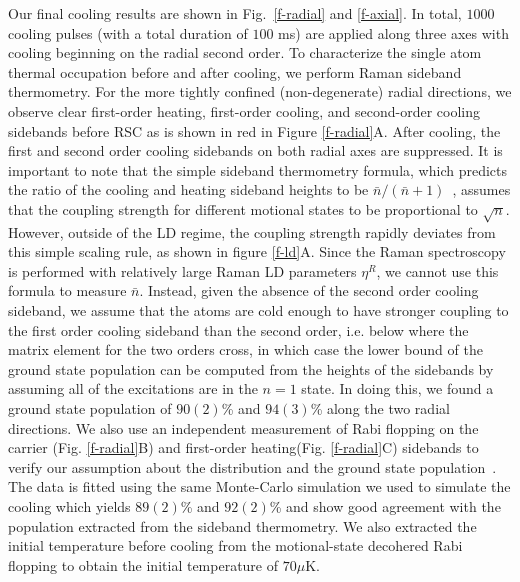 \documentclass[aps,prl,twocolumn,groupedaddress]{revtex4-1}
\begin{document}
Our final cooling results are shown in Fig.~\ref{f-radial} and \ref{f-axial}.
In total, $1000$ cooling pulses (with a total duration of $100$ ms) are applied
along three axes with cooling beginning on the radial second order.
To characterize the single atom thermal occupation before and after cooling,
we perform Raman sideband thermometry.
For the more tightly confined (non-degenerate) radial directions,
we observe clear first-order heating, first-order cooling,
and second-order cooling sidebands before RSC as is shown in red in Figure \ref{f-radial}A.
After cooling, the first and second order cooling sidebands on both radial axes are suppressed.
It is important to note that the simple sideband thermometry formula,
which predicts the ratio of the cooling and heating sideband heights
to be $\bar n / (\bar n + 1)$~\cite{Monroe1995},
assumes that the coupling strength for different motional states to be proportional to $\sqrt{n}$.
However, outside of the LD regime,
the coupling strength rapidly deviates from this simple scaling rule,
as shown in figure \ref{f-ld}A. Since the Raman spectroscopy is performed
with relatively large Raman LD parameters $\eta^R$, we cannot use this formula to
measure $\bar n$.
Instead, given the absence of the second order cooling sideband,
we assume that the atoms are cold enough to have stronger coupling to the first order cooling
sideband than the second order, i.e. below where the matrix element for the two orders cross,
in which case the lower bound of the ground state population
can be computed from the heights of the sidebands by assuming all of the excitations are in the
$n=1$ state. In doing this, we found a ground state population of $90(2)$\%
and $94(3)$\% along the two radial directions.
We also use an independent measurement of Rabi flopping on the carrier (Fig. \ref{f-radial}B)
and first-order heating(Fig. \ref{f-radial}C) sidebands
to verify our assumption about the distribution and the ground state population~\cite{Meekhof1996}.
The data is fitted using the same Monte-Carlo simulation we used to simulate the cooling
which yields $89(2)$\% and $92(2)$\% and show good agreement with
the population extracted from the sideband thermometry.
We also extracted the initial temperature before cooling
from the motional-state decohered Rabi flopping to obtain the initial temperature of $70 \mu$K.
\end{document}
